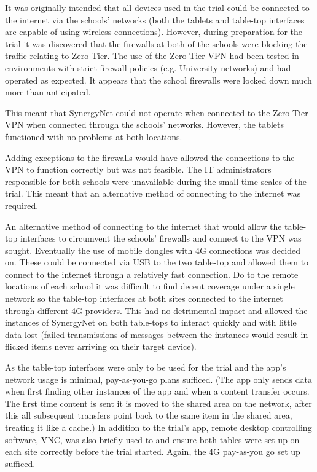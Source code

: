 \documentclass[a4paper,11pt]{article}
\begin{document}
It was originally intended that all devices used in the trial could be connected to the internet via the schools' networks (both the tablets and table-top interfaces are capable of using wireless connections).
However, during preparation for the trial it was discovered that the firewalls at both of the schools were blocking the traffic relating to Zero-Tier.
The use of the Zero-Tier VPN had been tested in environments with strict firewall policies (e.g. University networks) and had operated as expected.
It appears that the school firewalls were locked down much more than anticipated.

This meant that SynergyNet could not operate when connected to the Zero-Tier VPN when connected through the schools’ networks.
However, the tablets functioned with no problems at both locations.

Adding exceptions to the firewalls would have allowed the connections to the VPN to function correctly but was not feasible.
The IT administrators responsible for both schools were unavailable during the small time-scales of the trial.
This meant that an alternative method of connecting to the internet was required.

An alternative method of connecting to the internet that would allow the table-top interfaces to circumvent the schools’ firewalls and connect to the VPN was sought.
Eventually the use of mobile dongles with 4G connections was decided on.
These could be connected via USB to the two table-top and allowed them to connect to the internet through a relatively fast connection.
Do to the remote locations of each school it was difficult to find decent coverage under a single network so the table-top interfaces at both sites connected to the internet through different 4G providers.
This had no detrimental impact and allowed the instances of SynergyNet on both table-tops to interact quickly and with little data lost (failed transmissions of messages between the instances would result in flicked items never arriving on their target device).

As the table-top interfaces were only to be used for the trial and the app's network usage is minimal, pay-as-you-go plans sufficed.
(The app only sends data when first finding other instances of the app and when a content transfer occurs.
The first time content is sent it is moved to the shared area on the network, after this all subsequent transfers point back to the same item in the shared area, treating it like a cache.) In addition to the trial's app, remote desktop controlling software, VNC, was also briefly used to and ensure both tables were set up on each site correctly before the trial started.
Again, the 4G pay-as-you go set up sufficed.
\end{document}
